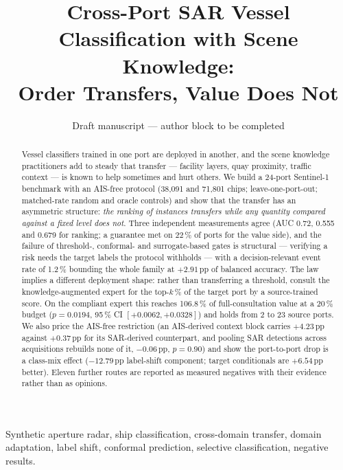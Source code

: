 \documentclass[journal]{IEEEtran}
\begin{document}
\title{Cross-Port SAR Vessel Classification with Scene Knowledge:\\
Order Transfers, Value Does Not}

\author{Draft manuscript --- author block to be completed}

\maketitle

\begin{abstract}
Vessel classifiers trained in one port are deployed in another, and the scene knowledge practitioners
add to steady that transfer --- facility layers, quay proximity, traffic context --- is known to help
sometimes and hurt others. We build a 24-port Sentinel-1 benchmark with an AIS-free protocol (38,091
and 71,801 chips; leave-one-port-out; matched-rate random and oracle controls) and show that the
transfer has an asymmetric structure: \emph{the ranking of instances transfers while any quantity
compared against a fixed level does not}. Three independent measurements agree (AUC 0.72, 0.555 and
0.679 for ranking; a guarantee met on 22\,\% of ports for the value side), and the failure of
threshold-, conformal- and surrogate-based gates is structural --- verifying a risk needs the target
labels the protocol withholds --- with a decision-relevant event rate of 1.2\,\% bounding the whole
family at $+2.91$\,pp of balanced accuracy. The law implies a different deployment shape: rather than
transferring a threshold, consult the knowledge-augmented expert for the top-$k$\,\% of the target
port by a source-trained score. On the compliant expert this reaches 106.8\,\% of full-consultation
value at a 20\,\% budget ($p = 0.0194$, 95\,\% CI $[+0.0062, +0.0328]$) and holds from 2 to 23 source
ports. We also price the AIS-free restriction (an AIS-derived context block carries $+4.23$\,pp
against $+0.37$\,pp for its SAR-derived counterpart, and pooling SAR detections across acquisitions
rebuilds none of it, $-0.06$\,pp, $p = 0.90$) and show the port-to-port drop is a class-mix effect
($-12.79$\,pp label-shift component; target conditionals are $+6.54$\,pp better). Eleven further
routes are reported as measured negatives with their evidence rather than as opinions.
\end{abstract}

\begin{IEEEkeywords}
Synthetic aperture radar, ship classification, cross-domain transfer, domain adaptation, label shift,
conformal prediction, selective classification, negative results.
\end{IEEEkeywords}
\end{document}

